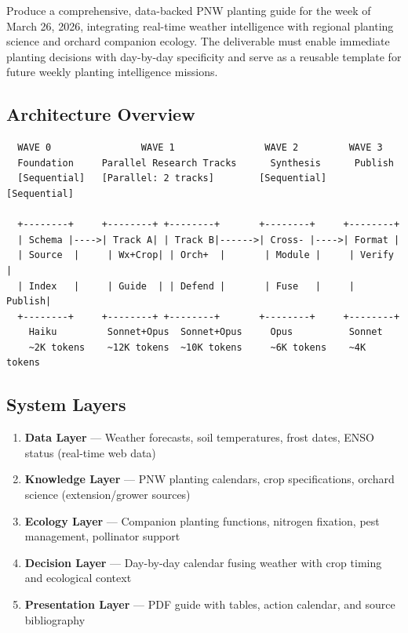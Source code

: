 \documentclass[11pt,letterpaper]{article}
\begin{document}
Produce a comprehensive, data-backed PNW planting guide for the week of March 26, 2026, integrating real-time weather intelligence with regional planting science and orchard companion ecology. The deliverable must enable immediate planting decisions with day-by-day specificity and serve as a reusable template for future weekly planting intelligence missions.

\subsection{Architecture Overview}

\begin{asciibox}
\begin{verbatim}
  WAVE 0                WAVE 1                WAVE 2         WAVE 3
  Foundation     Parallel Research Tracks      Synthesis      Publish
  [Sequential]   [Parallel: 2 tracks]        [Sequential]   [Sequential]

  +--------+     +--------+ +--------+       +--------+     +--------+
  | Schema |---->| Track A| | Track B|------>| Cross- |---->| Format |
  | Source  |     | Wx+Crop| | Orch+  |       | Module |     | Verify |
  | Index   |     | Guide  | | Defend |       | Fuse   |     | Publish|
  +--------+     +--------+ +--------+       +--------+     +--------+
    Haiku         Sonnet+Opus  Sonnet+Opus     Opus          Sonnet
    ~2K tokens    ~12K tokens  ~10K tokens     ~6K tokens    ~4K tokens
\end{verbatim}
\end{asciibox}

\subsection{System Layers}

\begin{enumerate}[leftmargin=*]
\item \textbf{Data Layer} --- Weather forecasts, soil temperatures, frost dates, ENSO status (real-time web data)
\item \textbf{Knowledge Layer} --- PNW planting calendars, crop specifications, orchard science (extension/grower sources)
\item \textbf{Ecology Layer} --- Companion planting functions, nitrogen fixation, pest management, pollinator support
\item \textbf{Decision Layer} --- Day-by-day calendar fusing weather with crop timing and ecological context
\item \textbf{Presentation Layer} --- PDF guide with tables, action calendar, and source bibliography
\end{enumerate}
\end{document}

